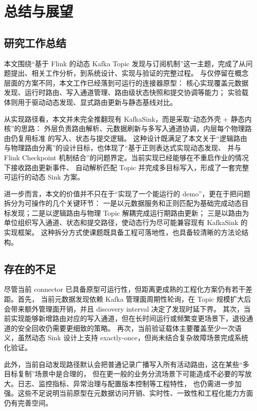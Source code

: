 
\chapter{总结与展望}

\section{研究工作总结}

本文围绕“基于 Flink 的动态 Kafka Topic 发现与订阅机制”这一主题，完成了从问题提出、相关工作分析，到系统设计、实现与验证的完整过程。
与仅停留在概念层面的方案不同，本文工作已经落到可运行的连接器原型：
核心实现覆盖元数据发现、运行时路由、写入通道管理、路由级状态快照和提交协调等能力；
实验载体则用于驱动动态发现、显式路由更新与静态基线对比。

从实现路径看，本文并未完全推翻现有 KafkaSink，而是采取“动态外壳 + 静态内核”的思路：
外层负责路由解析、元数据刷新与多写入通道协调，内层每个物理路由仍复用标准  的写入、状态与提交逻辑。
这种设计既满足了本文关于“逻辑路由与物理路由分离”的设计目标，也体现了“基于正则表达式实现动态发现、
并与 Flink Checkpoint 机制结合”的问题界定。当前实现已经能够在不重启作业的情况下接收路由更新事件、
自动解析匹配 Topic 并完成多目标写入，形成了一套完整可运行的动态 Sink 方案。

进一步而言，本文的价值并不只在于“实现了一个能运行的 demo”，更在于把问题拆分为可操作的几个关键环节：
一是以元数据服务和正则匹配为基础完成动态目标发现；二是以逻辑路由与物理 Topic 解耦完成运行期路由更新；
三是以路由为单位组织写入通道、状态和提交路径，使动态行为尽可能兼容现有 KafkaSink 的实现框架。
这种拆分方式使课题既具备工程可落地性，也具备较清晰的方法论结构。

\section{存在的不足}

尽管当前 connector 已具备原型可运行性，但距离更成熟的工程化方案仍有若干差距。首先，
当前元数据发现依赖 Kafka 管理面周期性轮询，在 Topic 规模扩大后会带来额外管理面开销，并且 discovery interval 决定了发现时延下界。
其次，当前实现能够新增路由对应的写入通道，但在长时间运行或频繁变更场景下，退役通道的安全回收仍需要更细致的策略。
再次，当前验证载体主要覆盖至少一次语义，虽然动态 Sink 设计上支持 exactly-once，但尚未结合复杂故障场景完成系统化验证。

此外，当前自动发现路径默认会把普通记录广播写入所有活动路由，这在某些“多目标复制”场景中是合理的，
但在更一般的业务分流场景下可能造成不必要的写放大。日志、监控指标、异常治理与配置版本控制等工程特性，
也仍需进一步加强。这些不足说明当前原型在元数据访问开销、实时性、一致性和工程化能力方面仍有完善空间。

